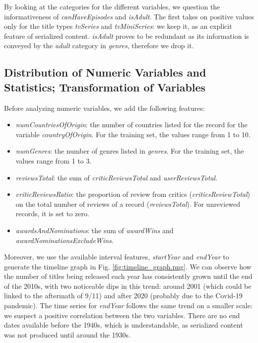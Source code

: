 By looking at the categories for the different variables, we question the informativeness of \textit{canHaveEpisodes} and \textit{isAdult}. The first takes on positive values only for the title types \textit{tvSeries} and \textit{tvMiniSeries}:  we keep it, as an explicit feature of serialized content. \textit{isAdult} proves to be redundant as its information is conveyed by the \textit{adult} category in \textit{genres}, therefore we drop it.

\subsection{Distribution of Numeric Variables and Statistics; Transformation of Variables}\label{numeric_vars_analysis}
Before analyzing numeric variables, we add the following features:
\begin{itemize}
    \item \textit{numCountriesOfOrigin}: the number of countries listed for the record for the variable \textit{countryOfOrigin}. For the training set, the values range from 1 to 10.
    \item \textit{numGenres}: the number of genres listed in \textit{genres}. For the training set, the values range from 1 to 3.
    \item \textit{reviewsTotal}: the sum of \textit{criticReviewsTotal} and \textit{userReviewsTotal}.
    \item \textit{criticReviewsRatio}: the proportion of review from critics (\textit{criticsReviewTotal}) on the total number of reviews of a record (\textit{reviewsTotal}). For unreviewed records, it is set to zero.
    \item \textit{awardsAndNominations}: the sum of \textit{awardWins} and \textit{awardNominationsExcludeWins}.
\end{itemize}

Moreover, we use the available interval features, \textit{startYear} and \textit{endYear} to generate the timeline graph in Fig. \ref{fig:timeline_graph.png}. We can observe how the number of titles being released each year has consistently grown until the end of the 2010s, with two noticeable dips in this trend: around 2001 (which could be linked to the aftermath of 9/11) and after 2020 (probably due to the Covid-19 pandemic). The time series for \textit{endYear} follows the same trend on a smaller scale: we suspect a positive correlation between the two variables. There are no end dates available before the 1940s, which is understandable, as serialized content was not produced until around the 1930s.



